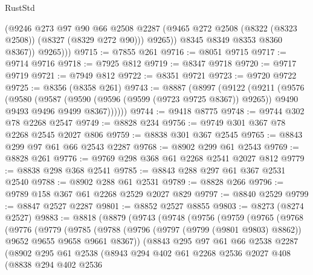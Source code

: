 \begin{lexlean}{RustStd}
\begin{coremodule}
                (@9246
                  @273
                  @97
                  @90
                  @66
                  @2508
                  @2287
                  (@9465 @272 @2508 (@8322 (@8323 @2508)) (@8327 (@8329 @272 @90)))
                  @9265))
              @8345
              @8349
              @8353
              @8360
              @8367))
          @9265)))
@9715 := @7855 @261
@9716 := @8051 @9715
@9717 := @9714 @9716
@9718 := @7925 @812
@9719 := @8347 @9718
@9720 := @9717 @9719
@9721 := @7949 @812
@9722 := @8351 @9721
@9723 := @9720 @9722
@9725 := @8356 (@8358 @261)
@9743 := @8887
    (@8997
      (@9122
        (@9211
          (@9576
            (@9580
              (@9587
                (@9590 (@9596 (@9599 (@9723 @9725 @8367)) @9265))
                @9490
                @9493
                @9496
                @9499
                @8367))))))
@9744 := @9418 @8775
@9748 := @9744 @302 @78 @2268 @2547
@9749 := @8828 @234
@9756 := @9749 @301 @367 @78 @2268 @2545 @2027 @806
@9759 := @8838 @301 @367 @2545
@9765 := @8843 @299 @97 @61 @66 @2543 @2287
@9768 := @8902 @299 @61 @2543
@9769 := @8828 @261
@9776 := @9769 @298 @368 @61 @2268 @2541 @2027 @812
@9779 := @8838 @298 @368 @2541
@9785 := @8843 @288 @297 @61 @367 @2531 @2540
@9788 := @8902 @288 @61 @2531
@9789 := @8828 @266
@9796 := @9789 @158 @367 @61 @2268 @2529 @2027 @829
@9797 := @8840 @2529
@9799 := @8847 @2527 @2287
@9801 := @8852 @2527 @8855
@9803 := @8273 (@8274 @2527)
@9883 := @8818
    (@8879
      (@9743
        (@9748
          (@9756
            (@9759
              (@9765
                (@9768
                  (@9776
                    (@9779
                      (@9785
                        (@9788
                          (@9796 (@9797 (@9799 (@9801 @9803) @8862)) @9652 @9655 @9658 @9661 @8367))
                        (@8843
                          @295
                          @97
                          @61
                          @66
                          @2538
                          @2287
                          (@8902
                            @295
                            @61
                            @2538
                            (@8943
                              @294
                              @402
                              @61
                              @2268
                              @2536
                              @2027
                              @408
                              (@8838
                                @294
                                @402
                                @2536

\end{coremodule}
\end{lexlean}
